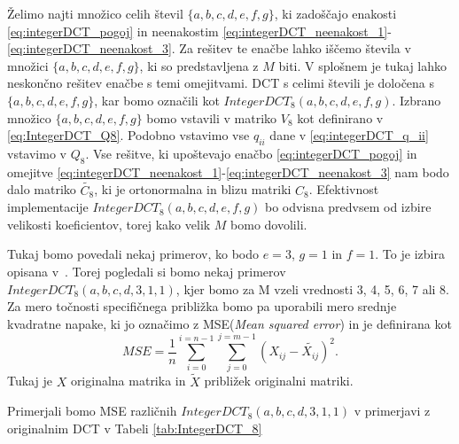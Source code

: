\documentclass[a4paper,12pt,openright]{book}
\begin{document}
Želimo najti množico celih števil $\{a,b,c,d,e,f,g\}$, ki zadoščajo enakosti \ref{eq:integerDCT_pogoj} in neenakostim \ref{eq:integerDCT_neenakost_1}-\ref{eq:integerDCT_neenakost_3}. Za rešitev te enačbe lahko iščemo števila v množici $\{a,b,c,d,e,f,g\}$, ki so predstavljena z $M$ biti. V splošnem je tukaj lahko neskončno rešitev enačbe s temi omejitvami. DCT s celimi števili je določena s $\{a,b,c,d,e,f,g\}$, kar bomo označili kot $IntegerDCT_8(a,b,c,d,e,f,g)$. Izbrano množico $\{a,b,c,d,e,f,g\}$ bomo vstavili v matriko $V_8$ kot definirano v \ref{eq:IntegerDCT_Q8}. Podobno vstavimo vse $q_{ii}$ dane v \ref{eq:integerDCT_q_ii} vstavimo v $Q_8$. Vse rešitve, ki upoštevajo enačbo \ref{eq:integerDCT_pogoj} in omejitve \ref{eq:integerDCT_neenakost_1}-\ref{eq:integerDCT_neenakost_3} nam bodo dalo matriko $\widetilde{C_8}$, ki je ortonormalna in blizu matriki $C_8$. Efektivnost implementacije $IntegerDCT_8(a,b,c,d,e,f,g)$ bo odvisna predvsem od izbire velikosti koeficientov, torej kako velik $M$ bomo dovolili.\par
Tukaj bomo povedali nekaj primerov, ko bodo $e=3$, $g=1$ in $f =1$. To je izbira opisana v~\cite{britanak2010discrete}. Torej pogledali si bomo nekaj primerov $IntegerDCT_8(a,b,c,d,3,1,1)$, kjer bomo za M vzeli vrednosti 3, 4, 5, 6, 7 ali 8. Za mero točnosti specifičnega približka bomo pa uporabili mero srednje kvadratne napake, ki jo označimo z MSE(\textit{Mean squared error}) in je definirana kot
\begin{equation} %
  MSE = \frac{1}{n}\sum_{i=0}^{i=n-1}\sum_{j=0}^{j=m-1}\left(X_{ij} - \widetilde{X_{ij}} \right)^2.
\label{eq:MSE}
\end{equation}
Tukaj je $X$ originalna matrika in $\widetilde{X}$ približek originalni matriki.\par
Primerjali bomo MSE različnih $IntegerDCT_8(a,b,c,d,3,1,1)$ v primerjavi z originalnim DCT v Tabeli \ref{tab:IntegerDCT_8}
\end{document}
